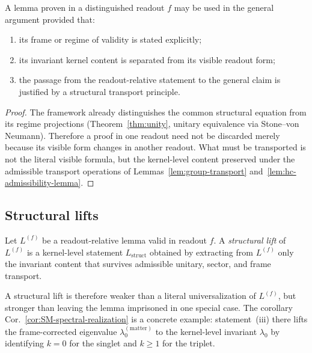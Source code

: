\begin{proposition}
\label{prop:legitimacy-restricted-lemmas}
A lemma proven in a distinguished readout $f$ may be used in the general
argument provided that:
\begin{enumerate}[label=(\roman*)]
 \item its frame or regime of validity is stated explicitly;
 \item its invariant kernel content is separated from its visible
 readout form;
 \item the passage from the readout-relative statement to the general
 claim is justified by a structural transport principle.
\end{enumerate}
\end{proposition}

\begin{proof}
The framework already distinguishes the common structural equation from
its regime projections (Theorem~\ref{thm:unity}, unitary equivalence via
Stone--von Neumann). Therefore a proof in one readout need not be
discarded merely because its visible form changes in another readout.
What must be transported is not the literal visible formula, but the
kernel-level content preserved under the admissible transport operations
of Lemmas~\ref{lem:group-transport} and~\ref{lem:hc-admissibility-lemma}.
\end{proof}

\subsection*{Structural lifts}

\begin{definition}
\label{def:structural-lift}
Let $L^{(f)}$ be a readout-relative lemma valid in readout $f$.
A \emph{structural lift} of $L^{(f)}$ is a kernel-level statement
$L_{\mathrm{struct}}$ obtained by extracting from $L^{(f)}$ only the
invariant content that survives admissible unitary, sector, and frame
transport.
\end{definition}

\begin{remark}
A structural lift is therefore weaker than a literal universalization of
$L^{(f)}$, but stronger than leaving the lemma imprisoned in one special
case. The corollary Cor.~\ref{cor:SM-spectral-realization} is a concrete
example: statement~(iii) there lifts the frame-corrected eigenvalue
$\lambda_0^{(\mathrm{matter})}$ to the kernel-level invariant $\lambda_0$
by identifying $k=0$ for the singlet and $k\ge 1$ for the triplet.
\end{remark}

